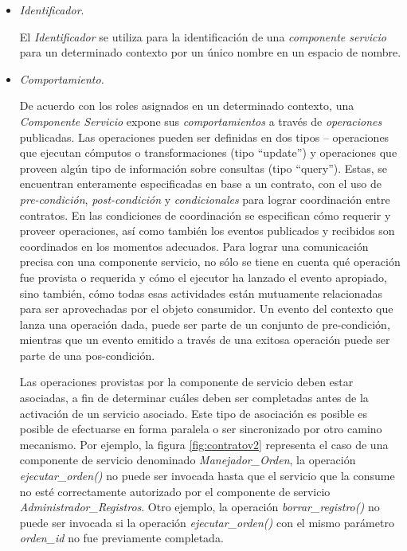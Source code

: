\begin{itemize}

\item \textit{Identificador}.

El \textit{Identificador} se utiliza para la identificación de una \textit{componente servicio} para un determinado contexto por un único nombre en un espacio de nombre.

\item \textit{Comportamiento.}

De acuerdo con los roles asignados en un determinado contexto, una
\textit{Componente Servicio} expone sus  \textit{comportamientos} a través de \textit{operaciones} publicadas. Las operaciones pueden ser definidas en dos tipos – operaciones que ejecutan cómputos o
transformaciones (tipo “update”) y operaciones que proveen algún tipo de información
sobre consultas (tipo “query”). Estas, se encuentran enteramente especificadas en base
a un contrato, con el uso de \textit{pre-condición}, \textit{post-condición} y \textit{condicionales} para lograr coordinación entre contratos. En las condiciones de coordinación se especifican cómo
requerir y proveer operaciones, así como también los eventos publicados y recibidos son coordinados en los momentos adecuados. Para lograr una comunicación precisa con una componente servicio, no sólo se tiene en cuenta qué operación fue provista o requerida y cómo el ejecutor ha lanzado el evento apropiado, sino también, cómo todas esas actividades están mutuamente relacionadas para ser aprovechadas por el objeto consumidor. Un evento del contexto que lanza una operación dada, puede ser parte de un conjunto de pre-condición, mientras que un evento emitido a través de una exitosa operación puede ser parte de una pos-condición.


Las operaciones provistas por la componente de servicio deben estar asociadas, a fin de determinar cuáles deben ser completadas antes de la activación de un servicio asociado. Este tipo de asociación es posible es posible de efectuarse en forma paralela o ser sincronizado por otro camino mecanismo. Por ejemplo, la figura \ref{fig:contratov2} representa el caso de una componente de servicio denominado \textit{Manejador\_Orden}, la operación \textit{ejecutar\_orden()} no puede ser invocada hasta que el servicio que la consume no esté correctamente autorizado por el componente de servicio \textit{Administrador\_Registros}. Otro ejemplo, la operación \textit{borrar\_registro()} no puede ser invocada si la operación \textit{ejecutar\_orden()} con el mismo parámetro \textit{orden\_id} no fue previamente completada.





\end{itemize}
